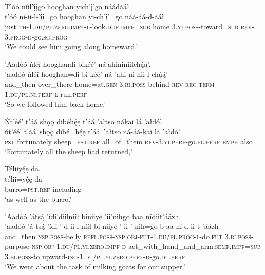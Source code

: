 \ea\label{ex:text6-9-4}
T’óó níil’į́įgo hooghan yich’į’go náádááł.\\
\gll t’óó	ní-ii-l-’į́į=go	hooghan	yi-ch’į’=go	náá-áá-d-ááł\\
     just	\textsc{th}-1.\textsc{du}/\textsc{pl}.\textsc{zero}.\textsc{impf}-\textsc{l}-look.\textsc{dur}.\textsc{impf}=\textsc{sub}	home	3.\textsc{yi}.\textsc{poss}-toward=\textsc{sub}	\textsc{rev}-3.\textsc{prog}-\textsc{d}-go.\textsc{sg}.\textsc{prog}\\
\glt `We could see him going along homeward.'
\z

\ea\label{ex:text6-9-5}
’Aadóó ńléí hooghandi bikéé’ ná’ahininiilchą́ą́’.\\
\gll ’aadóó	ńléí	hooghan=di	bi-kéé’	ná-’ahi-ni-nii-l-chą́ą́’\\
     and\_then	over\_there	home=at.\textsc{gen}	3.\textsc{bi}.\textsc{poss}-behind	\textsc{rev}-\textsc{rec}-\textsc{term}-1.\textsc{du}/\textsc{pl}.\textsc{ni}.\textsc{perf}-\textsc{l}-run.\textsc{perf}\\
\glt `So we followed him back home.'
\z

\newpage
\ea\label{ex:text6-9-6}
Ńt’éé’ t’áá shǫǫ dibéhę́ę t’áá ’ałtso nákai lá ’ałdó’.\\
\gll ńt’éé’	t’áá~{shǫǫ}	dibé=hę́ę	t’áá~{’ałtso}	ná-áá-kai	lá	’ałdó’\\
     \textsc{pst}	fortunately	sheep=\textsc{pst}.\textsc{ref}	all\_of\_them	\textsc{rev}-3.\textsc{yi}.\textsc{perf}-go.\textsc{pl}.\textsc{perf}	\textsc{emph}	also\\
\glt `Fortunately all the sheep had returned,'
\z

\ea\label{ex:text6-9-7}
Téliiyę́ę da.\\
\gll télii=yę́ę	da\\
     burro=\textsc{pst}.\textsc{ref}	including\\
\glt `as well as the burro.'
\z

\ea\label{ex:text6-9-8}
’Aadóó ’átsą́ ’ídi’diilnííł biniiyé ’ii’nihgo baa nídiit’áázh.\\
\gll ’aadóó	’á-tsą́ ’ídi-’-d-ii-l-nííł	bi-niiyé	’-ii-’-nih=go	b-aa	ní-d-ii-t-’áázh\\
     and\_then	\textsc{nsp}.\textsc{poss}-belly \textsc{refl}.\textsc{poss}-\textsc{nsp}.\textsc{obj}-\textsc{fut}-1.\textsc{du}/\textsc{pl}.\textsc{prog}-\textsc{l}-do.\textsc{fut}	3.\textsc{bi}.\textsc{poss}-purpose	\textsc{nsp}.\textsc{obj}-1.\textsc{du}/\textsc{pl}.\textsc{yi}.\textsc{zero}.\textsc{impf}-\textsc{d}-act\_with\_hand\_and\_arm.\textsc{semf}.\textsc{impf}=\textsc{sub}	3.\textsc{bi}.\textsc{poss}-to	upward-\textsc{inc}-1.\textsc{du}/\textsc{pl}.\textsc{yi}.\textsc{zero}.\textsc{perf}-\textsc{d}-go.\textsc{du}.\textsc{perf}\\
\glt `We went about the task of milking goats for our supper.'
\z

